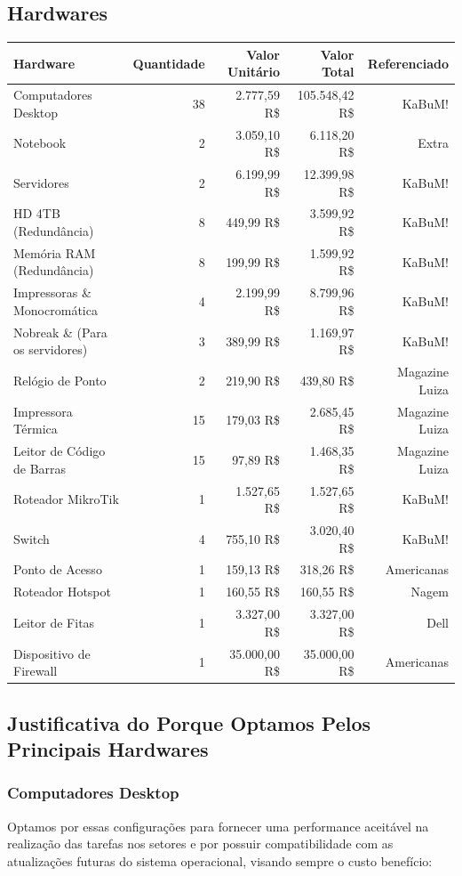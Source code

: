 \documentclass[12pt]{article}
\begin{document}
\subsection{Hardwares}
\begin{center}
\begin{tabular}{| l | r | r | r | r |}
\hline 
Hardware & Quantidade & Valor Unitário & Valor Total & Referenciado\\
\hline
Computadores Desktop & 38 & 2.777,59 R\$ & 105.548,42 R\$ & KaBuM!\\
Notebook & 2 & 3.059,10 R\$ & 6.118,20 R\$ & Extra\\
Servidores & 2 & 6.199,99 R\$ & 12.399,98 R\$ & KaBuM!\\
HD 4TB (Redundância) & 8 & 449,99 R\$ & 3.599,92 R\$ & KaBuM!\\
Memória RAM (Redundância) & 8 & 199,99 R\$ & 1.599,92 R\$ & KaBuM!\\
Impressoras \& Monocromática & 4 & 2.199,99 R\$ & 8.799,96 R\$ & KaBuM!\\
Nobreak \& (Para os servidores) & 3 & 389,99 R\$ & 1.169,97 R\$ & KaBuM!\\
Relógio de Ponto & 2 & 219,90 R\$ & 439,80 R\$ & Magazine Luiza\\ 
Impressora Térmica & 15 & 179,03 R\$ & 2.685,45 R\$ & Magazine Luiza\\
Leitor de Código de Barras & 15 & 97,89 R\$ & 1.468,35 R\$ & Magazine Luiza\\
Roteador MikroTik & 1 & 1.527,65 R\$ & 1.527,65 R\$ & KaBuM!\\
Switch & 4 & 755,10 R\$ & 3.020,40 R\$ & KaBuM!\\
Ponto de Acesso & 1 & 159,13 R\$ & 318,26 R\$ & Americanas\\
Roteador Hotspot & 1 & 160,55 R\$ & 160,55 R\$ & Nagem\\
Leitor de Fitas & 1 & 3.327,00 R\$ & 3.327,00 R\$ & Dell\\
Dispositivo de Firewall & 1 & 35.000,00 R\$ & 35.000,00 R\$ & Americanas\\
\hline
\end{tabular}
\end{center}

\subsection{Justificativa do Porque Optamos Pelos Principais Hardwares}

\subsubsection{Computadores Desktop}
Optamos por essas configurações para fornecer uma performance aceitável na realização das tarefas nos setores e por possuir compatibilidade com as atualizações futuras do sistema operacional, visando sempre o custo benefício:
\end{document}
